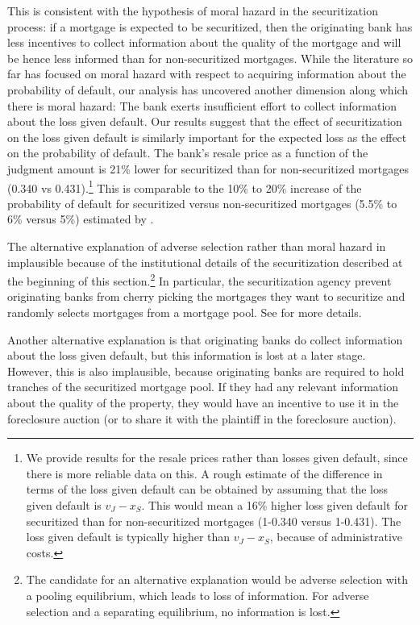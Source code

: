 \documentclass[11pt,twopage]{article}
\begin{document}
This is consistent with the hypothesis of moral hazard in the
securitization process: if a mortgage is expected to be securitized,
then the originating bank has less incentives to collect information
about the quality of the mortgage and will be hence less informed than
for non-securitized mortgages. While the literature so far has focused
on moral hazard with respect to acquiring information about the
probability of default, our analysis has uncovered another dimension
along which there is moral hazard: The bank exerts insufficient effort
to collect information about the loss given default. Our results
suggest that the effect of securitization on the loss given default is
similarly important for the expected loss as the effect on the
probability of default. The bank's resale price as a function of the
judgment amount is 21\% lower for securitized than for non-securitized
mortgages (0.340 vs 0.431).\footnote{We provide results for the resale
  prices rather than losses given default, since there is more
  reliable data on this. A rough estimate of the difference in terms
  of the loss given default can be obtained by assuming that the loss
  given default is $v_J-x_S$. This would mean a 16\% higher loss given
  default for securitized than for non-securitized mortgages (1-0.340
  versus 1-0.431). The loss given default is typically higher than
  $v_J-x_S$, because of administrative costs.} This is comparable to
the 10\% to 20\% increase of the probability of default for
securitized versus non-securitized mortgages (5.5\% to 6\% versus 5\%)
estimated by \cite{keys2008did}.

The alternative explanation of adverse selection rather than moral
hazard in implausible because of the institutional details of the
securitization described at the beginning of this
section.\footnote{The candidate for an alternative explanation would
  be adverse selection with a pooling equilibrium, which leads to loss
  of information. For adverse selection and a separating equilibrium,
  no information is lost.} In particular, the securitization agency
prevent originating banks from cherry picking the mortgages they want
to securitize and randomly selects mortgages from a mortgage pool. See
\cite{keys2008did} for more details.

Another alternative explanation is that originating banks do collect
information about the loss given default, but this information is lost
at a later stage. However, this is also implausible, because
originating banks are required to hold tranches of the securitized
mortgage pool. If they had any relevant information about the quality
of the property, they would have an incentive to use it in the
foreclosure auction (or to share it with the plaintiff in the
foreclosure auction).
\end{document}
